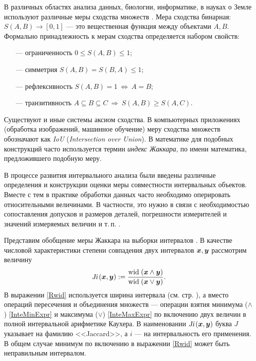 \documentclass[a5paper,openany]{book}
\newcommand{\mbf}[1]{\protect\text{\boldmath$#1$}}
\newcommand{\Ji}{\textsl{Ji}\,}
\newcommand{\w}{\mathrm{wid}\;}
\begin{document}
В различных областях анализа данных, биологии, информатике, в науках о Земле используют 
различные меры сходства множеств \cite{Jaccard}. Мера сходства бинарная: $S(A, B) \rightarrow 
[0, 1] $ --- это вещественная функция между объектами $A, B$.  Формально  принадлежность к мерам сходства определяется набором свойств:
\begin{itemize}
    \item[---] ограниченность $0 \leq S(A, B) \leq 1 $;
    \item[---] симметрия $S(A, B) = S(B,A)  \leq 1$;
    \item[---] рефлексивность $S(A, B)=1  \  \Leftrightarrow \  A=B $;
    \item[---] транзитивность 
               $A\subseteq B\subseteq C \  \Rightarrow \  S(A, B) \geq S(A, C)$.
\end{itemize}
Существуют и иные системы аксиом сходства.   
\label{JaccardMeasure} В компьютерных приложениях (обработка изображений, машинное обучение) 
меру сходства множеств обозначают как \emph{IoU} (\emph{Intersection over Union}). 
В математике для подобных конструкций часто используется термин \emph{индекс Жаккара}, 
по имени математика, предложившего подобную меру. 
  
В процессе развития интервального анализа были введены различные определения и конструкции 
оценки меры совместности интервальных объектов. Вместе с тем в практике обработки данных 
часто необходимо оперировать относительными величинами. В частности, это нужно в связи 
с необходимостью сопоставления допусков и размеров деталей, погрешности измерителей 
и значений измеряемых величин и т.\,п. \cite{Kabir2017}. 
  
Представим обобщение меры Жаккара на выборки интервалов \cite{Jaccard2022}. В качестве 
числовой характеристики степени совпадения двух интервалов $\mbf{x}, \mbf{y}$ рассмотрим  
величину 
\begin{equation}
\label{Rwid}
\Ji (\mbf{x}, \mbf{y}) := 
\frac{\w (\mbf{x} \wedge \mbf{y} )}{\w (\mbf{x} \vee \mbf{y})}.
\end{equation}
В выражении \eqref{Rwid} используется ширина интервала (см. стр. \pageref{InteWid}), 
а вместо операций пересечения и объединения множеств --- операции взятия  минимума 
($\wedge$) \eqref{InteMinExpr} и максимума ($\vee$) \eqref{InteMaxExpr} по включению 
двух величин в полной интервальной арифметике Каухера. В наименовании $\Ji (\mbf{x}, 
\mbf{y})$ буква $\textit{J}$ указывает на фамилию <<Jaccard>>, а $\textit{i}$ --- 
на интервальность его применения. В общем случае минимум по включению в выражении 
\eqref{Rwid} может быть неправильным интервалом. 
  
\end{document}
